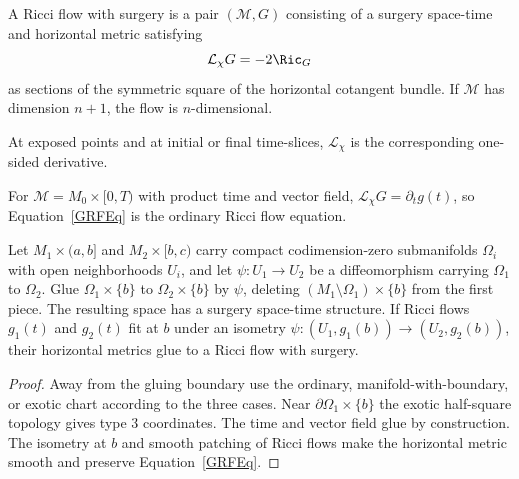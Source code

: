 \begin{definition}
\label{def:ricci-flow-with-surgery}
A Ricci flow with surgery is a pair $({\mathcal M},G)$ consisting of a surgery
space-time and horizontal metric satisfying
\begin{equation}
\label{GRFEq}
  {\mathcal L}_\chi G=-2\Ric_G
\end{equation}
as sections of the symmetric square of the horizontal cotangent bundle. If
${\mathcal M}$ has dimension $n+1$, the flow is $n$-dimensional.
\end{definition}

\begin{remark}
\label{rem:one-sided-lie-derivative}
At exposed points and at initial or final time-slices,
${\mathcal L}_\chi$ is the corresponding one-sided derivative.
\end{remark}

\begin{example}
\label{ex:ordinary-flow-as-surgery-flow}
For ${\mathcal M}=M_0\times[0,T)$ with product time and vector field,
${\mathcal L}_\chi G=\partial_tg(t)$, so Equation~\eqref{GRFEq} is the
ordinary Ricci flow equation.
\end{example}

\begin{lemma}
\label{lem:gluing-ricci-flows-with-surgery}
\label{gluingsoln}
Let $M_1\times(a,b]$ and $M_2\times[b,c)$ carry compact codimension-zero
submanifolds $\Omega_i$ with open neighborhoods $U_i$, and let
$\psi:U_1\to U_2$ be a diffeomorphism carrying $\Omega_1$ to $\Omega_2$.
Glue $\Omega_1\times\{b\}$ to $\Omega_2\times\{b\}$ by $\psi$, deleting
$(M_1\setminus\Omega_1)\times\{b\}$ from the first piece. The resulting
space has a surgery space-time structure. If Ricci flows $g_1(t)$ and $g_2(t)$
fit at $b$ under an isometry
$\psi:(U_1,g_1(b))\to(U_2,g_2(b))$, their horizontal metrics glue to a Ricci
flow with surgery.
\end{lemma}

\begin{proof}
\sketch
{}
Away from the gluing boundary use the ordinary, manifold-with-boundary, or
exotic chart according to the three cases. Near
$\partial\Omega_1\times\{b\}$ the exotic half-square topology gives type 3
coordinates. The time and vector field glue by construction. The isometry at
$b$ and smooth patching of Ricci flows make the horizontal metric smooth and
preserve Equation~\eqref{GRFEq}.
\end{proof}


